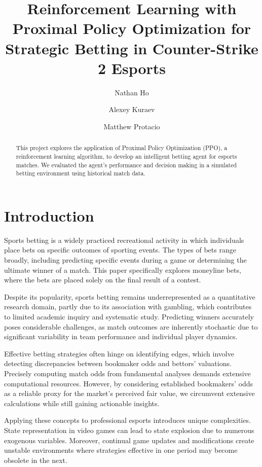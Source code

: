 \documentclass[sigconf]{acmart}
\title{Reinforcement Learning with Proximal Policy Optimization for Strategic Betting in Counter-Strike 2 Esports}
\author{Nathan Ho}
\affiliation{%
  \institution{Drexel University}
  \city{Philadelphia}
  \state{PA}
  \country{USA}
}
\author{Alexey Kuraev}
\affiliation{%
  \institution{Drexel University}
  \city{Philadelphia}
  \state{PA}
  \country{USA}
}
\author{Matthew Protacio}
\affiliation{%
  \institution{Drexel University}
  \city{Philadelphia}
  \state{PA}
  \country{USA}
}
\begin{document}

\begin{abstract}
This project explores the application of Proximal Policy Optimization (PPO), a reinforcement learning algorithm, to develop an intelligent betting agent for esports matches. We evaluated the agent's performance and decision making in a simulated betting environment using historical match data.
\end{abstract}

\maketitle

\section{Introduction}
Sports betting is a widely practiced recreational activity in which individuals place bets on specific outcomes of sporting events. The types of bets range broadly, including predicting specific events during a game or determining the ultimate winner of a match. This paper specifically explores moneyline bets, where the bets are placed solely on the final result of a contest.

Despite its popularity, sports betting remains underrepresented as a quantitative research domain, partly due to its association with gambling, which contributes to limited academic inquiry and systematic study. Predicting winners accurately poses considerable challenges, as match outcomes are inherently stochastic due to significant variability in team performance and individual player dynamics.

Effective betting strategies often hinge on identifying edges, which involve detecting discrepancies between bookmaker odds and bettors' valuations. Precisely computing match odds from fundamental analyses demands extensive computational resources. However, by considering established bookmakers' odds as a reliable proxy for the market's perceived fair value, we circumvent extensive calculations while still gaining actionable insights.

Applying these concepts to professional esports introduces unique complexities. State representation in video games can lead to state explosion due to numerous exogenous variables. Moreover, continual game updates and modifications create unstable environments where strategies effective in one period may become obsolete in the next.
\end{document}
